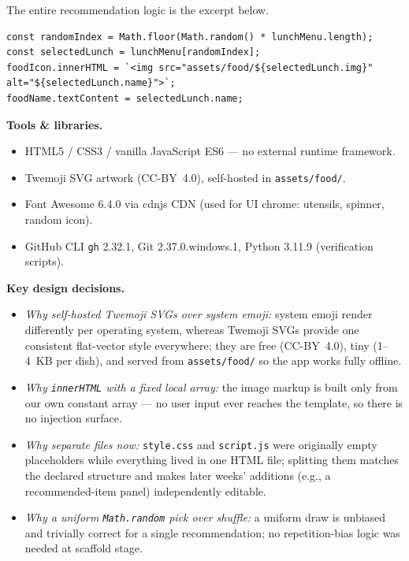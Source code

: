 \documentclass[11pt,a4paper]{article}
\begin{document}
The entire recommendation logic is the excerpt below.
\begin{lstlisting}
const randomIndex = Math.floor(Math.random() * lunchMenu.length);
const selectedLunch = lunchMenu[randomIndex];
foodIcon.innerHTML = `<img src="assets/food/${selectedLunch.img}" alt="${selectedLunch.name}">`;
foodName.textContent = selectedLunch.name;
\end{lstlisting}

\textbf{Tools \& libraries.}
\begin{itemize}[leftmargin=2em,itemsep=1pt]
  \item HTML5 / CSS3 / vanilla JavaScript ES6 --- no external runtime framework.
  \item Twemoji SVG artwork (CC-BY~4.0), self-hosted in \texttt{assets/food/}.
  \item Font Awesome 6.4.0 via cdnjs CDN (used for UI chrome: utensils, spinner, random icon).
  \item GitHub CLI \texttt{gh} 2.32.1, Git 2.37.0.windows.1, Python 3.11.9 (verification scripts).
\end{itemize}

\textbf{Key design decisions.}
\begin{itemize}[leftmargin=2em,itemsep=1pt]
  \item \emph{Why self-hosted Twemoji SVGs over system emoji:} system emoji render
        differently per operating system, whereas Twemoji SVGs provide one consistent
        flat-vector style everywhere; they are free (CC-BY~4.0), tiny (1--4~KB per dish),
        and served from \texttt{assets/food/} so the app works fully offline.
  \item \emph{Why \texttt{innerHTML} with a fixed local array:} the image markup is built
        only from our own constant array --- no user input ever reaches the template, so
        there is no injection surface.
  \item \emph{Why separate files now:} \texttt{style.css} and \texttt{script.js} were
        originally empty placeholders while everything lived in one HTML file; splitting
        them matches the declared structure and makes later weeks' additions
        (e.g., a recommended-item panel) independently editable.
  \item \emph{Why a uniform \texttt{Math.random} pick over shuffle:} a uniform draw is
        unbiased and trivially correct for a single recommendation; no repetition-bias
        logic was needed at scaffold stage.
\end{itemize}
\end{document}
